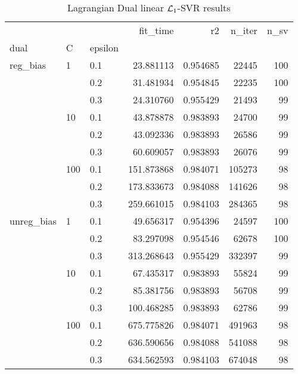 \begin{table}[H]
\centering
\caption{Lagrangian Dual linear $\protect \mathcal{L}_1$-SVR results}
\label{linear_lagrangian_dual_l1_svr_cv_results}
\begin{tabular}{lllrrrr}
\toprule
           &     &     &    fit\_time &        r2 &  n\_iter &  n\_sv \\
dual & C & epsilon &             &           &         &       \\
\midrule
reg\_bias & 1   & 0.1 &   23.881113 &  0.954685 &   22445 &   100 \\
           &     & 0.2 &   31.481934 &  0.954845 &   22235 &   100 \\
           &     & 0.3 &   24.310760 &  0.955429 &   21493 &    99 \\
           & 10  & 0.1 &   43.878878 &  0.983893 &   24700 &    99 \\
           &     & 0.2 &   43.092336 &  0.983893 &   26586 &    99 \\
           &     & 0.3 &   60.609057 &  0.983893 &   26076 &    99 \\
           & 100 & 0.1 &  151.873868 &  0.984071 &  105273 &    98 \\
           &     & 0.2 &  173.833673 &  0.984088 &  141626 &    98 \\
           &     & 0.3 &  259.661015 &  0.984103 &  284365 &    98 \\
unreg\_bias & 1   & 0.1 &   49.656317 &  0.954396 &   24597 &   100 \\
           &     & 0.2 &   83.297098 &  0.954546 &   62678 &   100 \\
           &     & 0.3 &  313.268643 &  0.955429 &  332397 &    99 \\
           & 10  & 0.1 &   67.435317 &  0.983893 &   55824 &    99 \\
           &     & 0.2 &   85.381756 &  0.983893 &   56708 &    99 \\
           &     & 0.3 &  100.468285 &  0.983893 &   62786 &    99 \\
           & 100 & 0.1 &  675.775826 &  0.984071 &  491963 &    98 \\
           &     & 0.2 &  636.590656 &  0.984088 &  541088 &    98 \\
           &     & 0.3 &  634.562593 &  0.984103 &  674048 &    98 \\
\bottomrule
\end{tabular}
\end{table}
